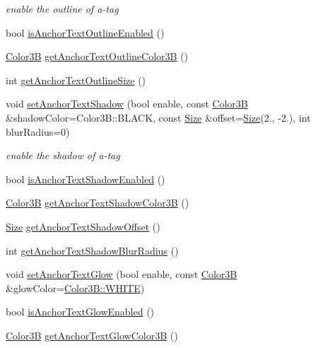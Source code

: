 \begin{DoxyCompactItemize}
\begin{DoxyCompactList}\small\item\em enable the outline of a-\/tag \end{DoxyCompactList}\item 
bool \hyperlink{classui_1_1RichText_a13483bdeac1fe64523469efe5afd597b}{is\+Anchor\+Text\+Outline\+Enabled} ()
\item 
\hyperlink{structColor3B}{Color3B} \hyperlink{classui_1_1RichText_a7df98348ce2190568baded594b3a52fb}{get\+Anchor\+Text\+Outline\+Color3B} ()
\item 
int \hyperlink{classui_1_1RichText_adb488707dcd66e8fd24271d617bbf536}{get\+Anchor\+Text\+Outline\+Size} ()
\item 
\mbox{\label{classui_1_1RichText_ae3e0bd83332893cd92078da8f4b0caab}} 
void \hyperlink{classui_1_1RichText_ae3e0bd83332893cd92078da8f4b0caab}{set\+Anchor\+Text\+Shadow} (bool enable, const \hyperlink{structColor3B}{Color3B} \&shadow\+Color=Color3\+B\+::\+B\+L\+A\+CK, const \hyperlink{classSize}{Size} \&offset=\hyperlink{classSize}{Size}(2., -\/2.), int blur\+Radius=0)
\begin{DoxyCompactList}\small\item\em enable the shadow of a-\/tag \end{DoxyCompactList}\item 
bool \hyperlink{classui_1_1RichText_a132592d95473377f4663f02fc605a9fc}{is\+Anchor\+Text\+Shadow\+Enabled} ()
\item 
\hyperlink{structColor3B}{Color3B} \hyperlink{classui_1_1RichText_a2a125ff069d785fea3e890b71d819392}{get\+Anchor\+Text\+Shadow\+Color3B} ()
\item 
\hyperlink{classSize}{Size} \hyperlink{classui_1_1RichText_a1f4a01e0e49d63694398c694288b81ae}{get\+Anchor\+Text\+Shadow\+Offset} ()
\item 
int \hyperlink{classui_1_1RichText_afd76a6cb26b1bf6a4c81ca52c05bd7ec}{get\+Anchor\+Text\+Shadow\+Blur\+Radius} ()
\item 
void \hyperlink{classui_1_1RichText_a71a3a6d9c9bb3c62b36b5b989b7a3c55}{set\+Anchor\+Text\+Glow} (bool enable, const \hyperlink{structColor3B}{Color3B} \&glow\+Color=\hyperlink{structColor3B_adf57cb86ca15f434b29215ad471cdc35}{Color3\+B\+::\+W\+H\+I\+TE})
\item 
bool \hyperlink{classui_1_1RichText_a633187b54e74c2f84d2ef1085fa2306d}{is\+Anchor\+Text\+Glow\+Enabled} ()
\item 
\hyperlink{structColor3B}{Color3B} \hyperlink{classui_1_1RichText_a2fe160ec411c8935e5d383e695fb1969}{get\+Anchor\+Text\+Glow\+Color3B} ()

\end{DoxyCompactItemize}
